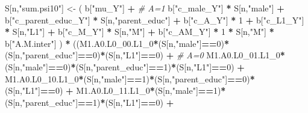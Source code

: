 \documentclass[
]{book}
\newenvironment{Shaded}{\begin{snugshade}}{\end{snugshade}}
\newcommand{\CommentTok}[1]{\textcolor[rgb]{0.56,0.35,0.01}{\textit{#1}}}
\newcommand{\DecValTok}[1]{\textcolor[rgb]{0.00,0.00,0.81}{#1}}
\newcommand{\NormalTok}[1]{#1}
\newcommand{\OtherTok}[1]{\textcolor[rgb]{0.56,0.35,0.01}{#1}}
\newcommand{\SpecialCharTok}[1]{\textcolor[rgb]{0.81,0.36,0.00}{\textbf{#1}}}
\newcommand{\StringTok}[1]{\textcolor[rgb]{0.31,0.60,0.02}{#1}}
\begin{document}
\begin{Shaded}
\begin{Highlighting}[]
\NormalTok{    S[n,}\StringTok{"sum.psi10"}\NormalTok{] }\OtherTok{\textless{}{-}}\NormalTok{  ( b[}\StringTok{"mu\_Y"}\NormalTok{] }\SpecialCharTok{+}                                          \CommentTok{\# A=1}
\NormalTok{                             b[}\StringTok{"c\_male\_Y"}\NormalTok{] }\SpecialCharTok{*}\NormalTok{ S[n,}\StringTok{"male"}\NormalTok{] }\SpecialCharTok{+} 
\NormalTok{                             b[}\StringTok{"c\_parent\_educ\_Y"}\NormalTok{] }\SpecialCharTok{*}\NormalTok{ S[n,}\StringTok{"parent\_educ"}\NormalTok{] }\SpecialCharTok{+} 
\NormalTok{                             b[}\StringTok{"c\_A\_Y"}\NormalTok{] }\SpecialCharTok{*} \DecValTok{1} \SpecialCharTok{+}
\NormalTok{                             b[}\StringTok{"c\_L1\_Y"}\NormalTok{] }\SpecialCharTok{*}\NormalTok{ S[n,}\StringTok{"L1"}\NormalTok{] }\SpecialCharTok{+}
\NormalTok{                             b[}\StringTok{"c\_M\_Y"}\NormalTok{] }\SpecialCharTok{*}\NormalTok{ S[n,}\StringTok{"M"}\NormalTok{] }\SpecialCharTok{+}
\NormalTok{                             b[}\StringTok{"c\_AM\_Y"}\NormalTok{] }\SpecialCharTok{*} \DecValTok{1} \SpecialCharTok{*}\NormalTok{ S[n,}\StringTok{"M"}\NormalTok{] }\SpecialCharTok{*}\NormalTok{ b[}\StringTok{"A.M.inter"}\NormalTok{] ) }\SpecialCharTok{*}
\NormalTok{      ((M1.A0.L0\_00.L1\_0}\SpecialCharTok{*}\NormalTok{(S[n,}\StringTok{"male"}\NormalTok{]}\SpecialCharTok{==}\DecValTok{0}\NormalTok{)}\SpecialCharTok{*}\NormalTok{(S[n,}\StringTok{"parent\_educ"}\NormalTok{]}\SpecialCharTok{==}\DecValTok{0}\NormalTok{)}\SpecialCharTok{*}\NormalTok{(S[n,}\StringTok{"L1"}\NormalTok{]}\SpecialCharTok{==}\DecValTok{0}\NormalTok{) }\SpecialCharTok{+} \CommentTok{\# A\textquotesingle{}=0}
\NormalTok{          M1.A0.L0\_01.L1\_0}\SpecialCharTok{*}\NormalTok{(S[n,}\StringTok{"male"}\NormalTok{]}\SpecialCharTok{==}\DecValTok{0}\NormalTok{)}\SpecialCharTok{*}\NormalTok{(S[n,}\StringTok{"parent\_educ"}\NormalTok{]}\SpecialCharTok{==}\DecValTok{1}\NormalTok{)}\SpecialCharTok{*}\NormalTok{(S[n,}\StringTok{"L1"}\NormalTok{]}\SpecialCharTok{==}\DecValTok{0}\NormalTok{) }\SpecialCharTok{+}
\NormalTok{          M1.A0.L0\_10.L1\_0}\SpecialCharTok{*}\NormalTok{(S[n,}\StringTok{"male"}\NormalTok{]}\SpecialCharTok{==}\DecValTok{1}\NormalTok{)}\SpecialCharTok{*}\NormalTok{(S[n,}\StringTok{"parent\_educ"}\NormalTok{]}\SpecialCharTok{==}\DecValTok{0}\NormalTok{)}\SpecialCharTok{*}\NormalTok{(S[n,}\StringTok{"L1"}\NormalTok{]}\SpecialCharTok{==}\DecValTok{0}\NormalTok{) }\SpecialCharTok{+} 
\NormalTok{          M1.A0.L0\_11.L1\_0}\SpecialCharTok{*}\NormalTok{(S[n,}\StringTok{"male"}\NormalTok{]}\SpecialCharTok{==}\DecValTok{1}\NormalTok{)}\SpecialCharTok{*}\NormalTok{(S[n,}\StringTok{"parent\_educ"}\NormalTok{]}\SpecialCharTok{==}\DecValTok{1}\NormalTok{)}\SpecialCharTok{*}\NormalTok{(S[n,}\StringTok{"L1"}\NormalTok{]}\SpecialCharTok{==}\DecValTok{0}\NormalTok{) }\SpecialCharTok{+}

\end{Highlighting}
\end{Shaded}
\end{document}
